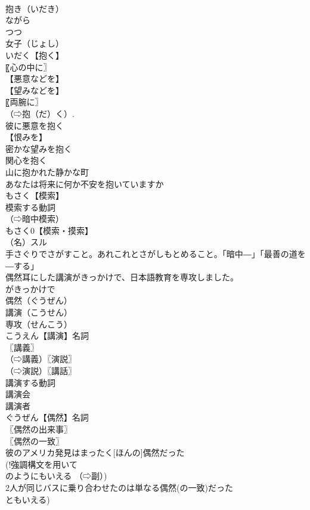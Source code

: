 \documentclass[8pt]{extreport}
\begin{document}
\begin{CJK}{UTF8}{min}
\\	抱き（いだき）
\\	ながら 
\\	つつ
\\	女子（じょし）
\\	いだく【抱く】
\\	〖心の中に〗
\\	【悪意などを】
\\	【望みなどを】
\\	〖両腕に〗
\\	（⇨抱（だ）く）.
\\	彼に悪意を抱く
\\	【恨みを】
\\	密かな望みを抱く
\\	関心を抱く
\\	山に抱かれた静かな町
\\	あなたは将来に何か不安を抱いていますか
\\	もさく【模索】
\\	模索する動詞
\\	（⇨暗中模索）
\\	もさく0【模索・摸索】
\\	（名）スル
\\	手さぐりでさがすこと。あれこれとさがしもとめること。「暗中―」「最善の道を―する」
\\	偶然耳にした講演がきっかけで、日本語教育を専攻しました。		
\\	がきっかけで　
\\	偶然（ぐうぜん）
\\	講演（こうせん）
\\	専攻（せんこう）
\\	こうえん【講演】名詞
\\	〖講義〗
\\	（⇨講義）〖演説〗
\\	（⇨演説）〖講話〗
\\	講演する動詞
\\	講演会
\\	講演者
\\	ぐうぜん【偶然】名詞
\\	〖偶然の出来事〗
\\	〖偶然の一致〗
\\	彼のアメリカ発見はまったく[ほんの]偶然だった
\\	(!強調構文を用いて 
\\	のようにもいえる （⇨副）)
\\	2人が同じバスに乗り合わせたのは単なる偶然(の一致)だった
\\	ともいえる) 

\end{CJK}
\end{document}
